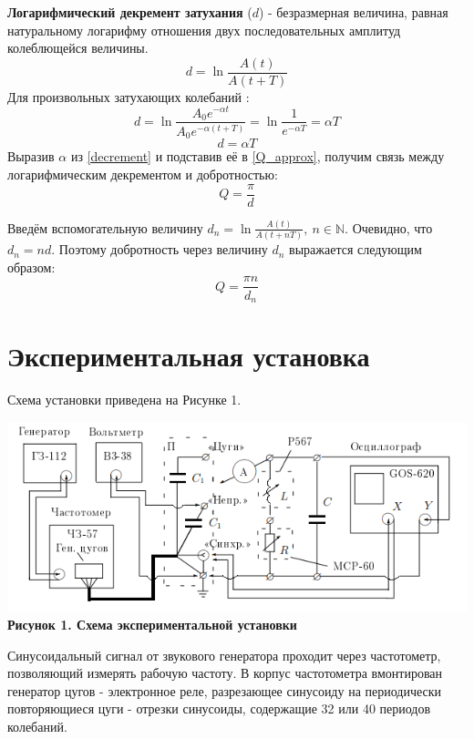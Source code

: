 \documentclass[15pt,a5paper,reqno]{article}
\begin{document}
    \textbf{Логарифмический декремент затухания} ($d$) - безразмерная величина, равная натуральному логарифму отношения двух последовательных амплитуд колеблющейся величины.
    \begin{equation*}
        d = \ln{\frac{A(t)}{A(t + T)}}
    \end{equation*}
    Для произвольных затухающих колебаний :
    \[d = \ln{\frac{A_0e^{-\alpha t}}{A_0e^{-\alpha(t + T)}}} = \ln{\frac{1}{e^{-\alpha T}}} = \alpha T\]
    \begin{equation}\label{decrement}
        \boxed{d = \alpha T}
    \end{equation}
    Выразив $\alpha$ из \eqref{decrement} и подставив её в \eqref{Q_approx}, получим связь между логарифмическим декрементом и добротностью:
    \begin{equation*}
        \boxed{Q = \frac{\pi}{d}}
    \end{equation*}

    Введём вспомогательную величину $d_n = \ln{\frac{A(t)}{A(t + nT)}},\ n\in\mathbb{N}$. Очевидно, что $d_n = nd$. Поэтому добротность через величину $d_n$ выражается следующим образом:
    \begin{equation}\label{Q_decrement}
        \boxed{Q = \frac{\pi n}{d_n}}
    \end{equation}
    
\section{Экспериментальная установка}

    Схема установки приведена на Рисунке 1.
    
    \begin{center}
        \includegraphics[width = \textwidth]{images/setup.png}
        \textbf{Рисунок 1. Схема экспериментальной установки}
    \end{center}

    Синусоидальный сигнал от звукового генератора проходит через частотометр, позволяющий измерять рабочую частоту. В корпус частотометра вмонтирован генератор цугов - электронное реле, разрезающее синусоиду на периодически повторяющиеся цуги - отрезки синусоиды, содержащие 32 или 40 периодов колебаний.
\end{document}
